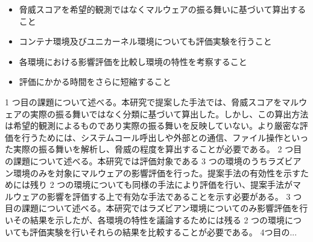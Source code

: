 \documentclass[12pt,a4paper,titlepage,report]{jsbook}
\begin{document}
\begin{itemize}
	\item 脅威スコアを希望的観測ではなくマルウェアの振る舞いに基づいて算出すること
	\item コンテナ環境及びユニカーネル環境についても評価実験を行うこと
	\item 各環境における影響評価を比較し環境の特性を考察すること
	\item 評価にかかる時間をさらに短縮すること %
\end{itemize}

1 つ目の課題について述べる。本研究で提案した手法では、脅威スコアをマルウェアの実際の振る舞いではなく分類に基づいて算出した。しかし、この算出方法は希望的観測によるものであり実際の振る舞いを反映していない。より厳密な評価を行うためには、システムコール呼出しや外部との通信、ファイル操作といった実際の振る舞いを解析し、脅威の程度を算出することが必要である。  
2 つ目の課題について述べる。本研究では評価対象である 3 つの環境のうちラズビアン環境のみを対象にマルウェアの影響評価を行った。提案手法の有効性を示すためには残り 2 つの環境についても同様の手法により評価を行い、提案手法がマルウェアの影響を評価する上で有効な手法であることを示す必要がある。
3 つ目の課題について述べる。本研究ではラズビアン環境についてのみ影響評価を行いその結果を示したが、各環境の特性を議論するためには残る 2 つの環境についても評価実験を行いそれらの結果を比較することが必要である。
4つ目の...



\end{document}
